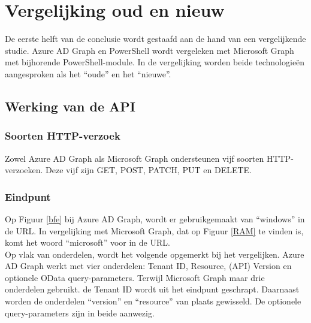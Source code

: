 
\chapter{Vergelijking oud en nieuw}%
\label{ch:vergelijking}

De eerste helft van de conclusie wordt gestaafd aan de hand van een vergelijkende studie. Azure \ac{AD} Graph en PowerShell wordt vergeleken met Microsoft Graph met bijhorende PowerShell-module. In de vergelijking worden beide technologieën aangesproken als het “oude” en het “nieuwe”. 

\section{Werking van de API}


  

\subsection{Soorten HTTP-verzoek}

Zowel Azure \ac{AD} Graph als Microsoft Graph ondersteunen vijf soorten \ac{HTTP}-verzoeken. Deze vijf zijn GET, POST, PATCH, PUT en DELETE. 

\subsection{Eindpunt}

Op Figuur \ref{bfe} bij Azure \ac{AD} Graph, wordt er gebruikgemaakt van “windows” in de \ac{URL}. In vergelijking met Microsoft Graph, dat op Figuur \ref{RAM} te vinden is, komt het woord “microsoft” voor in de \ac{URL}. \\

Op vlak van onderdelen, wordt het volgende opgemerkt bij het vergelijken. Azure \ac{AD} Graph werkt met vier onderdelen: Tenant ID, Resource, (\ac{API}) Version en optionele OData query-parameters. Terwijl Microsoft Graph maar drie onderdelen gebruikt. de Tenant ID wordt uit het eindpunt geschrapt. Daarnaast worden de onderdelen “version” en “resource” van plaats gewisseld. De optionele query-parameters zijn in beide aanwezig. 


